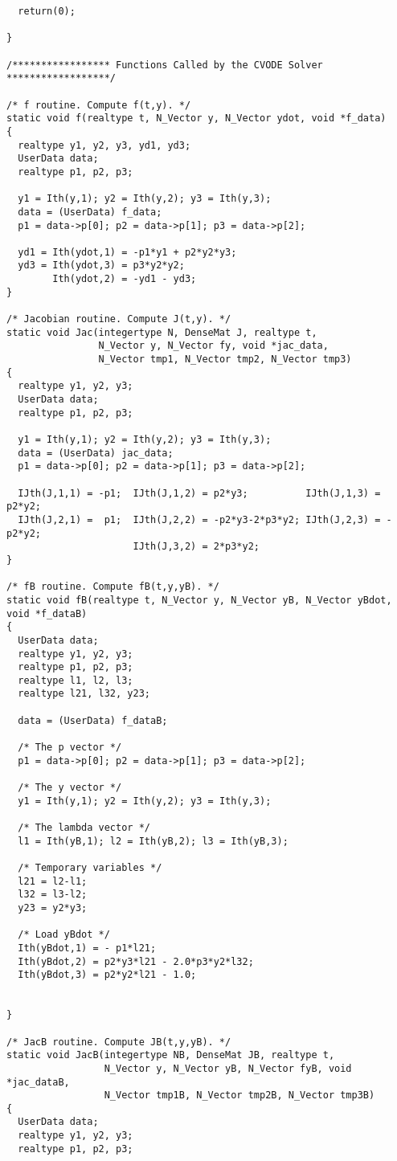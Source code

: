 \begin{verbatim}
  return(0);

}

/***************** Functions Called by the CVODE Solver ******************/

/* f routine. Compute f(t,y). */
static void f(realtype t, N_Vector y, N_Vector ydot, void *f_data)
{
  realtype y1, y2, y3, yd1, yd3;
  UserData data;
  realtype p1, p2, p3;

  y1 = Ith(y,1); y2 = Ith(y,2); y3 = Ith(y,3);
  data = (UserData) f_data;
  p1 = data->p[0]; p2 = data->p[1]; p3 = data->p[2];

  yd1 = Ith(ydot,1) = -p1*y1 + p2*y2*y3;
  yd3 = Ith(ydot,3) = p3*y2*y2;
        Ith(ydot,2) = -yd1 - yd3;
}

/* Jacobian routine. Compute J(t,y). */
static void Jac(integertype N, DenseMat J, realtype t,
                N_Vector y, N_Vector fy, void *jac_data, 
                N_Vector tmp1, N_Vector tmp2, N_Vector tmp3)
{
  realtype y1, y2, y3;
  UserData data;
  realtype p1, p2, p3;
 
  y1 = Ith(y,1); y2 = Ith(y,2); y3 = Ith(y,3);
  data = (UserData) jac_data;
  p1 = data->p[0]; p2 = data->p[1]; p3 = data->p[2];
 
  IJth(J,1,1) = -p1;  IJth(J,1,2) = p2*y3;          IJth(J,1,3) = p2*y2;
  IJth(J,2,1) =  p1;  IJth(J,2,2) = -p2*y3-2*p3*y2; IJth(J,2,3) = -p2*y2;
                      IJth(J,3,2) = 2*p3*y2;
}
 
/* fB routine. Compute fB(t,y,yB). */
static void fB(realtype t, N_Vector y, N_Vector yB, N_Vector yBdot, void *f_dataB)
{
  UserData data;
  realtype y1, y2, y3;
  realtype p1, p2, p3;
  realtype l1, l2, l3;
  realtype l21, l32, y23;
  
  data = (UserData) f_dataB;

  /* The p vector */
  p1 = data->p[0]; p2 = data->p[1]; p3 = data->p[2];

  /* The y vector */
  y1 = Ith(y,1); y2 = Ith(y,2); y3 = Ith(y,3);
  
  /* The lambda vector */
  l1 = Ith(yB,1); l2 = Ith(yB,2); l3 = Ith(yB,3);

  /* Temporary variables */
  l21 = l2-l1;
  l32 = l3-l2;
  y23 = y2*y3;

  /* Load yBdot */
  Ith(yBdot,1) = - p1*l21;
  Ith(yBdot,2) = p2*y3*l21 - 2.0*p3*y2*l32;
  Ith(yBdot,3) = p2*y2*l21 - 1.0;


}

/* JacB routine. Compute JB(t,y,yB). */
static void JacB(integertype NB, DenseMat JB, realtype t,
                 N_Vector y, N_Vector yB, N_Vector fyB, void *jac_dataB,
                 N_Vector tmp1B, N_Vector tmp2B, N_Vector tmp3B)
{
  UserData data;
  realtype y1, y2, y3;
  realtype p1, p2, p3;
  

\end{verbatim}
